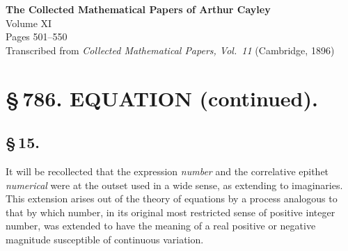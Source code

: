 \documentclass[11pt,a4paper]{article}
\begin{document}
\thispagestyle{empty}
\begin{center}
\Large\textbf{The Collected Mathematical Papers of Arthur Cayley}\\[6pt]
\large Volume XI\\[12pt]
\normalsize Pages 501--550\\[6pt]
\small Transcribed from \textit{Collected Mathematical Papers, Vol.~11} (Cambridge, 1896)
\end{center}
\vspace{2\baselineskip}

\section*[Article 786]{\S\,786. EQUATION (continued).}


\subsection*{\S\,15.}

It will be recollected that the expression \textit{number} and the correlative epithet \textit{numerical} were at the outset used in a wide sense, as extending to imaginaries. This extension arises out of the theory of equations by a process analogous to that by which number, in its original most restricted sense of positive integer number, was extended to have the meaning of a real positive or negative magnitude susceptible of continuous variation.
\end{document}
